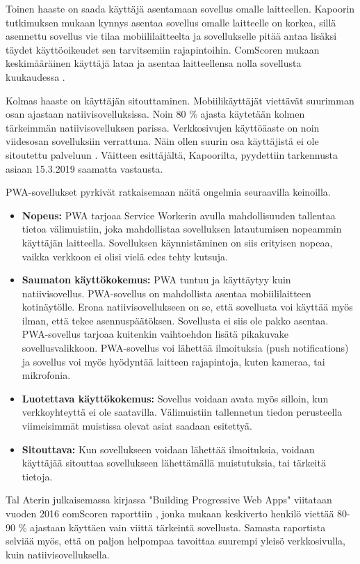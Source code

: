 \documentclass{tktltiki}
\begin{document}
Toinen haaste on saada käyttäjä asentamaan sovellus omalle laitteellen. Kapoorin tutkimuksen mukaan \cite{Kapoor} kynnys asentaa sovellus omalle laitteelle on korkea, sillä asennettu sovellus vie tilaa mobiililaitteelta ja sovellukselle pitää antaa lisäksi täydet käyttöoikeudet sen tarvitsemiin rajapintoihin. ComScoren mukaan keskimääräinen käyttäjä lataa ja asentaa laitteellensa nolla sovellusta kuukaudessa \cite{Perez}.

Kolmas haaste on käyttäjän sitouttaminen. Mobiilikäyttäjät viettävät suurimman osan ajastaan natiivisovelluksissa. Noin 80 \% ajasta käytetään kolmen tärkeimmän natiivisovelluksen parissa. Verkkosivujen käyttöäaste on noin viidesosan sovelluksiin verrattuna. Näin ollen suurin osa käyttäjistä ei ole sitoutettu palveluun \cite{Kapoor}. Väitteen esittäjältä, Kapoorilta, pyydettiin tarkennusta asiaan 15.3.2019 saamatta vastausta.

PWA-sovellukset pyrkivät ratkaisemaan näitä ongelmia seuraavilla keinoilla.

\begin{itemize}
  \item \textbf{Nopeus:} PWA tarjoaa Service Workerin avulla mahdollisuuden tallentaa tietoa välimuistiin, joka mahdollistaa sovelluksen latautumisen nopeammin käyttäjän laitteella. Sovelluksen käynnistäminen on siis erityisen nopeaa, vaikka verkkoon ei olisi vielä edes tehty kutsuja.
  \item \textbf{Saumaton käyttökokemus:} PWA tuntuu ja käyttäytyy kuin natiivisovellus. PWA-sovellus on mahdollista asentaa mobiililaitteen kotinäytölle. Erona natiivisovellukseen on se, että sovellusta voi käyttää myös ilman, että tekee asennuspäätöksen. Sovellusta ei siis ole pakko asentaa. PWA-sovellus tarjoaa kuitenkin vaihtoehdon lisätä pikakuvake sovellusvalikkoon. PWA-sovellus voi lähettää ilmoituksia (push notifications) ja sovellus voi myös hyödyntää laitteen rajapintoja, kuten kameraa, tai mikrofonia. 
  \item \textbf{Luotettava käyttökokemus:} Sovellus voidaan avata myös silloin, kun verkkoyhteyttä ei ole saatavilla. Välimuistiin tallennetun tiedon perusteella viimeisimmät muistissa olevat asiat saadaan esitettyä. 
  \item \textbf{Sitouttava:} Kun sovellukseen voidaan lähettää ilmoituksia, voidaan käyttäjää sitouttaa sovellukseen lähettämällä muistutuksia, tai tärkeitä tietoja. 
\end{itemize}

Tal Aterin julkaisemassa kirjassa "Building Progressive Web Apps" \cite{ater2017building} viitataan vuoden 2016 comScoren raporttiin \cite{comScore}, jonka mukaan keskiverto henkilö viettää 80-90 \% ajastaan käyttäen vain viittä tärkeintä sovellusta. Samasta raportista selviää myös, että on paljon helpompaa tavoittaa suurempi yleisö verkkosivulla, kuin natiivisovelluksella. 
\end{document}
